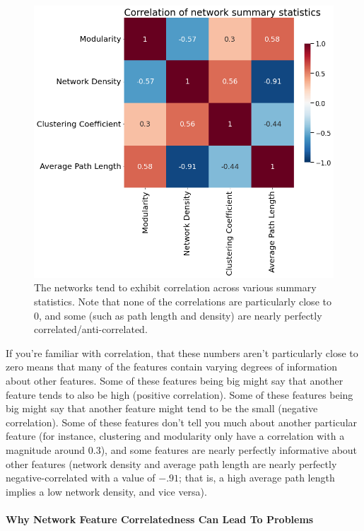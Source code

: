 \begin{figure}[h]
    \centering
    \includegraphics[width=0.8\linewidth]{representations/ch4/Images/corr.png}
    \caption[Correlation of netework features experiment]{The networks tend to exhibit correlation across various summary statistics. Note that none of the correlations are particularly close to $0$, and some (such as path length and density) are nearly perfectly correlated/anti-correlated.}
    \label{fig:ch4:corr}
\end{figure}

If you're familiar with correlation, that these numbers aren't particularly close to zero means that many of the features contain varying degrees of information about other features. Some of these features being big might say that another feature tends to also be high (positive correlation). Some of these features being big might say that another feature might tend to be the small (negative correlation). Some of these features don't tell you much about another particular feature (for instance, clustering and modularity only have a correlation with a magnitude around $0.3$), and some features are nearly perfectly informative about other features (network density and average path length are nearly perfectly negative-correlated with a value of $-.91$; that is, a high average path length implies a low network density, and vice versa). 

\paragraph{Why Network Feature Correlatedness Can Lead To Problems}

